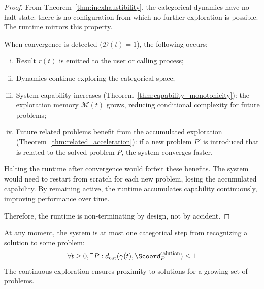 \begin{proof}
From Theorem~\ref{thm:inexhaustibility}, the categorical dynamics have no halt state: there is no configuration from which no further exploration is possible. The runtime mirrors this property.

When convergence is detected ($\mathcal{D}(t) = 1$), the following occurs:
\begin{enumerate}[(i)]
    \item Result $r(t)$ is emitted to the user or calling process;
    \item Dynamics continue exploring the categorical space;
    \item System capability increases (Theorem~\ref{thm:capability_monotonicity}): the exploration memory $\mathcal{M}(t)$ grows, reducing conditional complexity for future problems;
    \item Future related problems benefit from the accumulated exploration (Theorem~\ref{thm:related_acceleration}): if a new problem $P'$ is introduced that is related to the solved problem $P$, the system converges faster.
\end{enumerate}

Halting the runtime after convergence would forfeit these benefits. The system would need to restart from scratch for each new problem, losing the accumulated capability. By remaining active, the runtime accumulates capability continuously, improving performance over time.

Therefore, the runtime is non-terminating by design, not by accident.
\end{proof}

\begin{corollary}
\label{cor:always_one_step}
At any moment, the system is at most one categorical step from recognizing a solution to some problem:
\begin{equation}
\forall t \geq 0, \exists P: d_{\text{cat}}(\gamma(t), \Scoord_P^{\text{solution}}) \leq 1
\end{equation}
The continuous exploration ensures proximity to solutions for a growing set of problems.
\end{corollary}

